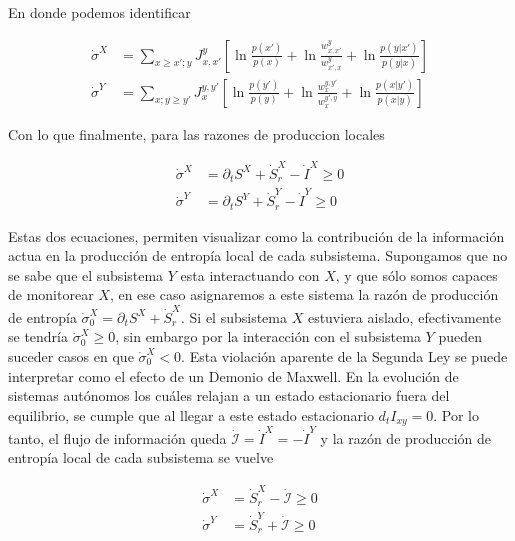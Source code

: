 En donde podemos identificar

\begin{align*}
    \dot{\sigma}^{X} &  = \sum_{x \geq x';y} J_{x,x'}^{y} \left[ \ln \frac{p(x')}{p(x)}  +\ln \frac{w_{x,x'}^{y}}{ w_{x',x}^{y} } + \ln \frac{p(y|x')}{p(y|x)} \right] \\
    \dot{\sigma}^{Y} &  = \sum_{x;y \geq y'} J_{x}^{y,y'} \left[ \ln \frac{p(y')}{p(y)}  + \ln \frac{w_{x}^{y,y'}}{ w_{x}^{y',y} } + \ln \frac{p(x|y')}{p(x|y)} \right] 
\end{align*}

Con lo que finalmente, para las razones de produccion locales

\begin{align*}
    \dot{\sigma}^{X} & = \partial_{t}S^{X} + \dot{S}_{r}^{X} - \dot{I}^{X} \geq 0 \\
    \dot{\sigma}^{Y} & = \partial_{t}S^{Y} + \dot{S}_{r}^{Y} - \dot{I}^{Y} \geq 0
\end{align*}

Estas dos ecuaciones, permiten visualizar como la contribución de la información actua en la producción de entropía local de cada subsistema. Supongamos que no se sabe que el subsistema $Y$ esta interactuando con $X$, y que sólo somos capaces de monitorear $X$, en ese caso asignaremos a este sistema la razón de producción de entropía $\dot{\sigma}^{X}_{0} = \partial_{t}S^{X} + \dot{S}_{r}^{X}$. Si el subsistema $X$ estuviera aislado, efectivamente se tendría $\dot{\sigma}^{X}_{0} \geq 0$, sin embargo por la interacción  con el subsistema $Y$ pueden suceder casos en que $\dot{\sigma}^{X}_{0}<0$. Esta violación aparente de la Segunda Ley se puede interpretar como el efecto de un Demonio de Maxwell. En la evolución de sistemas autónomos los cuáles relajan a un estado estacionario fuera del equilibrio, se cumple que al llegar a este estado estacionario $d_{t}I_{xy} = 0$. Por lo tanto, el flujo de información queda $\dot{\mathcal{I}} = \dot{I}^{X} = - \dot{I}^{Y}$ y la razón de producción de entropía local de cada subsistema se vuelve

\begin{align*}
    \dot{\sigma}^{X} & = \dot{S}_{r}^{X} - \dot{\mathcal{I}} \geq 0 \\
    \dot{\sigma}^{Y} & =  \dot{S}_{r}^{Y} + \dot{\mathcal{I}} \geq 0  
\end{align*}

